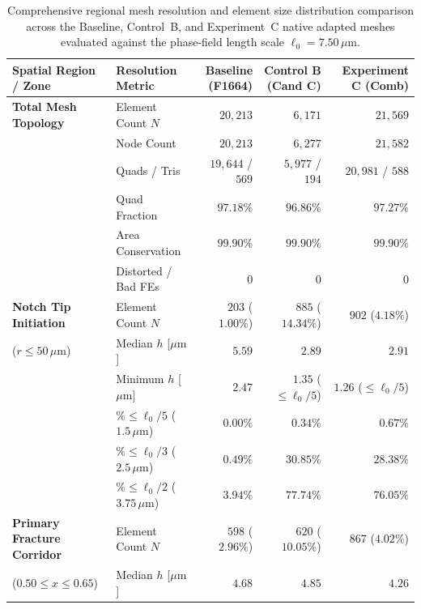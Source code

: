 \begin{table}[htbp]
\centering
\footnotesize
\renewcommand{\arraystretch}{0.92}
\caption{Comprehensive regional mesh resolution and element size distribution comparison across the Baseline, Control~B, and Experiment~C native adapted meshes evaluated against the phase-field length scale $\ell_0 = 7.50\,\mu\mathrm{m}$.}
\label{tab:f1684_adapted_mesh_resolution_comparison}
\begin{tabularx}{\textwidth}{p{3.5cm}p{2.1cm}rrr}
\hline
\textbf{Spatial Region / Zone} & \textbf{Resolution Metric} & \textbf{Baseline (F1664)} & \textbf{Control B (Cand C)} & \textbf{Experiment C (Comb)} \\
\hline
\textbf{Total Mesh Topology} & Element Count $N$ & $20{,}213$ & $6{,}171$ & $21{,}569$ \\
                             & Node Count & $20{,}213$ & $6{,}277$ & $21{,}582$ \\
                             & Quads / Tris & $19{,}644$ / $569$ & $5{,}977$ / $194$ & $20{,}981$ / $588$ \\
                             & Quad Fraction & $97.18\%$ & $96.86\%$ & $97.27\%$ \\
                             & Area Conservation & $99.90\%$ & $99.90\%$ & $99.90\%$ \\
                             & Distorted / Bad FEs & $0$ & $0$ & $0$ \\
\hline
\textbf{Notch Tip Initiation} & Element Count $N$ & $203$ ($1.00\%$) & $885$ ($14.34\%$) & $902$ ($4.18\%$) \\
($r \le 50\,\mu\mathrm{m}$)  & Median $h$ [$\mu\mathrm{m}$] & $5.59$ & $\mathbf{2.89}$ & $\mathbf{2.91}$ \\
                             & Minimum $h$ [$\mu\mathrm{m}$] & $2.47$ & $1.35$ ($\le \ell_0/5$) & $1.26$ ($\le \ell_0/5$) \\
                             & $\% \le \ell_0 / 5$ ($1.5\,\mu\mathrm{m}$) & $0.00\%$ & $0.34\%$ & $\mathbf{0.67\%}$ \\
                             & $\% \le \ell_0 / 3$ ($2.5\,\mu\mathrm{m}$) & $0.49\%$ & $30.85\%$ & $\mathbf{28.38\%}$ \\
                             & $\% \le \ell_0 / 2$ ($3.75\,\mu\mathrm{m}$) & $3.94\%$ & $77.74\%$ & $\mathbf{76.05\%}$ \\
\hline
\textbf{Primary Fracture Corridor} & Element Count $N$ & $598$ ($2.96\%$) & $620$ ($10.05\%$) & $867$ ($4.02\%$) \\
($0.50 \le x \le 0.65$)      & Median $h$ [$\mu\mathrm{m}$] & $4.68$ & $4.85$ & $\mathbf{4.26}$ \\

\end{tabularx}
\end{table}
